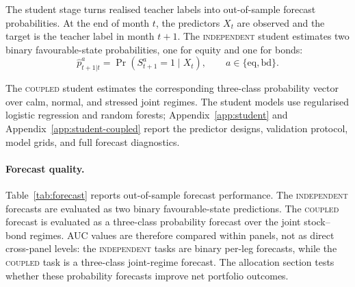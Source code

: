 \documentclass[10pt]{article}
\newcommand{\Acoup}{\textsc{coupled}}
\newcommand{\Bindep}{\textsc{independent}}
\begin{document}
The student stage turns realised teacher labels into out-of-sample forecast probabilities.
At the end of month \(t\), the predictors \(X_t\) are observed and the target is the teacher
label in month \(t+1\). The \Bindep{} student estimates two binary favourable-state
probabilities, one for equity and one for bonds:
\begin{equation}
    \hat p^a_{t+1|t}
    =
    \Pr\!\left(S^a_{t+1}=1\mid X_t\right),
    \qquad a\in\{\mathrm{eq},\mathrm{bd}\}.
    \label{eq:independent-student-probability}
\end{equation}

The \Acoup{} student estimates the corresponding three-class probability vector over calm,
normal, and stressed joint regimes. The student models use regularised logistic regression
and random forests; Appendix~\ref{app:student} and Appendix~\ref{app:student-coupled}
report the predictor designs, validation protocol, model grids, and full forecast
diagnostics.

\paragraph{Forecast quality.}
Table~\ref{tab:forecast} reports out-of-sample forecast performance. The \Bindep{} forecasts
are evaluated as two binary favourable-state predictions. The \Acoup{} forecast is evaluated
as a three-class probability forecast over the joint stock--bond regimes. AUC values are
therefore compared within panels, not as direct cross-panel levels: the \Bindep{} tasks are
binary per-leg forecasts, while the \Acoup{} task is a three-class joint-regime forecast. The
allocation section tests whether these probability forecasts improve net portfolio outcomes.
\end{document}
